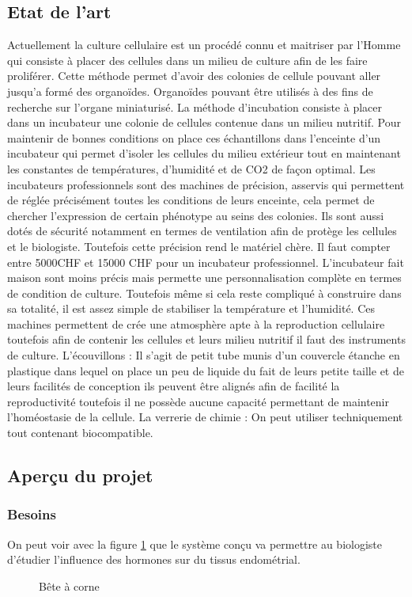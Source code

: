\documentclass[a4paper, 11pt]{article}
\begin{document}
\subsection{Etat de l'art}
Actuellement la culture cellulaire est un procédé connu et maitriser par l'Homme qui consiste à placer des cellules dans un milieu de culture afin de les faire proliférer.
Cette méthode permet d'avoir des colonies de cellule pouvant aller jusqu'a formé des organoïdes.
Organoïdes pouvant être utilisés à des fins de recherche sur l'organe miniaturisé.
La méthode d'incubation consiste à placer dans un incubateur une colonie de cellules contenue dans un milieu nutritif.
Pour maintenir de bonnes conditions on place ces échantillons dans l'enceinte d'un incubateur qui permet d'isoler les cellules du milieu extérieur tout en maintenant les constantes de températures, d'humidité et de CO2 de façon optimal.
Les incubateurs professionnels sont des machines de précision, asservis qui permettent de réglée précisément toutes les conditions de leurs enceinte, cela permet de chercher l'expression de certain phénotype au seins des colonies.
Ils sont aussi dotés de sécurité notamment en termes de ventilation afin de protège les cellules et le biologiste. Toutefois cette précision rend le matériel chère.
Il faut compter entre 5000CHF et 15000 CHF pour un incubateur professionnel.
L'incubateur fait maison sont moins précis mais permette une personnalisation complète en termes de condition de culture.
Toutefois même si cela reste compliqué à construire dans sa totalité, il est assez simple de stabiliser la température et l'humidité.
Ces machines permettent de crée une atmosphère apte à la reproduction cellulaire toutefois afin de contenir les cellules et leurs milieu nutritif il faut des instruments de culture.
L'écouvillons : Il s'agit de petit tube munis d'un couvercle étanche en plastique dans lequel on place un peu de liquide du fait de leurs petite taille et de leurs facilités de conception ils peuvent être alignés afin de facilité la reproductivité toutefois il ne possède aucune capacité permettant de maintenir l'homéostasie de la cellule.
La verrerie de chimie : On peut utiliser techniquement tout contenant biocompatible.
\newpage
\subsection{Aperçu du projet}
\subsubsection{Besoins}
On peut voir avec la figure \ref{fig:bete_corne} que le système conçu va permettre au biologiste d'étudier l'influence des hormones sur du tissus endométrial.
\begin{figure}[H]
    \centering
    \caption{Bête à corne}
    \label{fig:bete_corne}
\end{figure}
\end{document}
